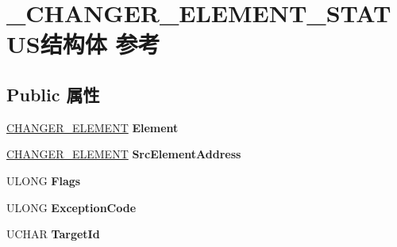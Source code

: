 \hypertarget{struct___c_h_a_n_g_e_r___e_l_e_m_e_n_t___s_t_a_t_u_s}{}\section{\+\_\+\+C\+H\+A\+N\+G\+E\+R\+\_\+\+E\+L\+E\+M\+E\+N\+T\+\_\+\+S\+T\+A\+T\+U\+S结构体 参考}
\label{struct___c_h_a_n_g_e_r___e_l_e_m_e_n_t___s_t_a_t_u_s}
\subsection*{Public 属性}
\begin{DoxyCompactItemize}
\item 
\mbox{\label{struct___c_h_a_n_g_e_r___e_l_e_m_e_n_t___s_t_a_t_u_s_a022e12189b02475b2cad52e52d1d3346}} 
\hyperlink{struct___c_h_a_n_g_e_r___e_l_e_m_e_n_t}{C\+H\+A\+N\+G\+E\+R\+\_\+\+E\+L\+E\+M\+E\+NT} {\bfseries Element}
\item 
\mbox{\label{struct___c_h_a_n_g_e_r___e_l_e_m_e_n_t___s_t_a_t_u_s_abb26220df29fe3ae95a509eebc4c6d71}} 
\hyperlink{struct___c_h_a_n_g_e_r___e_l_e_m_e_n_t}{C\+H\+A\+N\+G\+E\+R\+\_\+\+E\+L\+E\+M\+E\+NT} {\bfseries Src\+Element\+Address}
\item 
\mbox{\label{struct___c_h_a_n_g_e_r___e_l_e_m_e_n_t___s_t_a_t_u_s_acda999b6e6b1475b5e355614baa17245}} 
U\+L\+O\+NG {\bfseries Flags}
\item 
\mbox{\label{struct___c_h_a_n_g_e_r___e_l_e_m_e_n_t___s_t_a_t_u_s_a16f70a16e72e9a13b6aae91d0d7fa454}} 
U\+L\+O\+NG {\bfseries Exception\+Code}
\item 
\mbox{\label{struct___c_h_a_n_g_e_r___e_l_e_m_e_n_t___s_t_a_t_u_s_ab1db9b4e21af971f2758ca89121237bf}} 
U\+C\+H\+AR {\bfseries Target\+Id}
\item 
\mbox{\label{struct___c_h_a_n_g_e_r___e_l_e_m_e_n_t___s_t_a_t_u_s_a8c96405123af816887567db67f658f99}} 

\end{DoxyCompactItemize}
